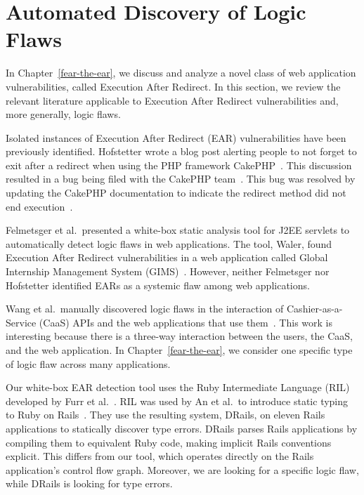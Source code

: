 \section{Automated Discovery of Logic Flaws}

In Chapter~\ref{fear-the-ear}, we discuss and analyze a novel class of
web application vulnerabilities, called Execution After Redirect. In
this section, we review the relevant literature applicable to
Execution After Redirect vulnerabilities and, more generally, logic
flaws.

Isolated instances of Execution After Redirect (EAR) vulnerabilities
have been previously identified. Hofstetter wrote a blog post alerting
people to not forget to exit after a redirect when using the PHP
framework CakePHP~\cite{hofstetter06:redirect}. This discussion
resulted in a bug being filed with the CakePHP
team~\cite{cake-ear-bug:06}. This bug was resolved by updating the
CakePHP documentation to indicate the redirect method did not end
execution~\cite{cake-doc-bug:06}.

Felmetsger et al.\ presented a white-box static analysis tool for J2EE
servlets to automatically detect logic flaws in web applications. The
tool, Waler, found Execution After Redirect vulnerabilities in a web
application called Global Internship Management System
(GIMS)~\cite{felmetsger10:logic}. However, neither Felmetsger nor
Hofstetter identified EARs as a systemic flaw among web applications.

Wang et al.\ manually discovered logic flaws in the interaction of
Cashier-as-a-Service (CaaS) APIs and the web applications that use
them~\cite{wang11:caas}. This work is interesting because there is a
three-way interaction between the users, the CaaS, and the web
application. In Chapter~\ref{fear-the-ear}, we consider one specific
type of logic flaw across many applications.

Our white-box EAR detection tool uses the Ruby Intermediate Language
(RIL) developed by Furr et al.~\cite{furr09:ril}. RIL was used by An
et al.\ to introduce static typing to Ruby on Rails~\cite{an09:stror}.
They use the resulting system, DRails, on eleven Rails applications to
statically discover type errors. DRails parses Rails applications by
compiling them to equivalent Ruby code, making implicit Rails
conventions explicit. This differs from our tool, which operates
directly on the Rails application's control flow graph. Moreover, we
are looking for a specific logic flaw, while DRails is looking for
type errors.

